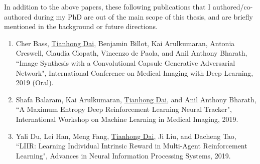 In addition to the above papers, these following publications that I authored/co-authored during my PhD are out of the main scope of this thesis, and are briefly mentioned in the background or future directions.
\begin{enumerate}
	\item Cher Bass, \underline{Tianhong Dai}, Benjamin Billot, Kai Arulkumaran, Antonia Creswell, Claudia Clopath, Vincenzo de Paola, and Anil Anthony Bharath, ``Image Synthesis with a Convolutional Capsule Generative Adversarial Network", International Conference on Medical Imaging with Deep Learning, 2019 (Oral).
	\item Shafa Balaram, Kai Arulkumaran, \underline{Tianhong Dai}, and Anil Anthony Bharath, ``A Maximum Entropy Deep Reinforcement Learning Neural Tracker", International Workshop on Machine Learning in Medical Imaging, 2019.
	\item Yali Du, Lei Han, Meng Fang, \underline{Tianhong Dai}, Ji Liu, and Dacheng Tao, ``LIIR: Learning Individual Intrinsic Reward in Multi-Agent Reinforcement Learning", Advances in Neural Information Processing Systems, 2019.
\end{enumerate}